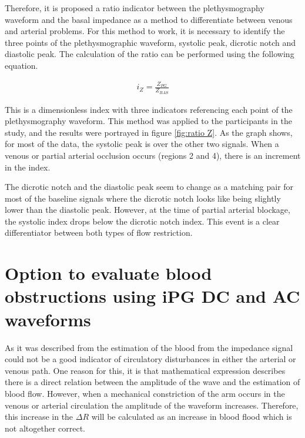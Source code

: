 Therefore, it is proposed a ratio indicator between the plethysmography waveform and the basal impedance as a method to differentiate between venous and arterial problems. For this method to work, it is necessary to identify the three points of the plethysmographic waveform, systolic peak, dicrotic notch and diastolic peak. The calculation of the ratio can be performed using the following equation.

\begin{align}
	\label{eq:ratio Z}
	i_Z = \frac{Z_{PG}}{Z_{BAS}}
\end{align}


This is a dimensionless index with three indicators referencing each point of the plethysmography waveform. This method was applied to the participants in the study, and the results were portrayed in figure \ref{fig:ratio Z}. As the graph shows, for most of the data, the systolic peak is over the other two signals. When a venous or partial arterial occlusion occurs (regions 2 and 4), there is an increment in the index. 

The dicrotic notch and the diastolic peak seem to change as a matching pair for most of the baseline signals where the dicrotic notch looks like being slightly lower than the diastolic peak. However, at the time of partial arterial blockage, the systolic index drops below the dicrotic notch index. This event is a clear differentiator between both types of flow restriction.

\section{Option to evaluate blood obstructions using iPG DC and AC waveforms}  %
\label{section discussion 3}

As it was described from the estimation of the blood from the impedance signal could not be a good indicator of circulatory disturbances in either the arterial or venous path. One reason for this, it is that mathematical expression describes there is a direct relation between the amplitude of the wave and the estimation of blood flow. However, when a mechanical constriction of the arm occurs in the venous or arterial circulation the amplitude of the waveform increases. Therefore, this increase in the $\Delta R$ will be calculated as an increase in blood flood which is not altogether correct. 

